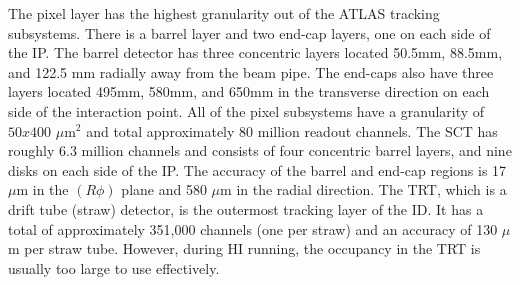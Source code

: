 The pixel layer has the highest granularity out of the ATLAS tracking subsystems. There is a barrel layer and two end-cap layers, one on each side of the IP. The barrel detector has three concentric layers located 50.5mm, 88.5mm, and 122.5 mm radially away from the beam pipe. The end-caps also have three layers located 495mm, 580mm, and 650mm in the transverse direction on each side of the interaction point. All of the pixel subsystems have a granularity of $50x400$ $\mu\mathrm{m}^{2}$ and total approximately 80 million readout channels. The SCT has roughly 6.3 million channels and consists of four concentric barrel layers, and nine disks on each side of the IP. The accuracy of the barrel and end-cap regions is 17 $\mu$m in the $(R\phi)$ plane and 580 $\mu$m in the radial direction. The TRT, which is a drift tube (straw) detector, is the outermost tracking layer of the ID. It has a total of approximately 351,000 channels (one per straw) and an accuracy of 130 $\mu$m per straw tube. However, during HI running, the occupancy in the TRT is usually too large to use effectively.

\FloatBarrier